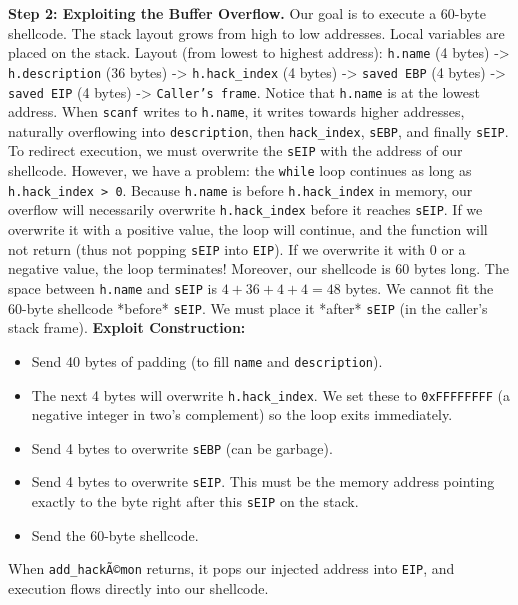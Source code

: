 \documentclass{article}
\begin{document}
\textbf{Step 2: Exploiting the Buffer Overflow.}
Our goal is to execute a 60-byte shellcode.
The stack layout grows from high to low addresses. Local variables are placed on the stack.
Layout (from lowest to highest address): \texttt{h.name} (4 bytes) -> \texttt{h.description} (36 bytes) -> \texttt{h.hack\_index} (4 bytes) -> \texttt{saved EBP} (4 bytes) -> \texttt{saved EIP} (4 bytes) -> \texttt{Caller's frame}.
Notice that \texttt{h.name} is at the lowest address. When \texttt{scanf} writes to \texttt{h.name}, it writes towards higher addresses, naturally overflowing into \texttt{description}, then \texttt{hack\_index}, \texttt{sEBP}, and finally \texttt{sEIP}.
To redirect execution, we must overwrite the \texttt{sEIP} with the address of our shellcode.
However, we have a problem: the \texttt{while} loop continues as long as \texttt{h.hack\_index > 0}. Because \texttt{h.name} is before \texttt{h.hack\_index} in memory, our overflow will necessarily overwrite \texttt{h.hack\_index} before it reaches \texttt{sEIP}. If we overwrite it with a positive value, the loop will continue, and the function will not return (thus not popping \texttt{sEIP} into \texttt{EIP}). If we overwrite it with $0$ or a negative value, the loop terminates!
Moreover, our shellcode is 60 bytes long. The space between \texttt{h.name} and \texttt{sEIP} is $4 + 36 + 4 + 4 = 48$ bytes. We cannot fit the 60-byte shellcode *before* \texttt{sEIP}. We must place it *after* \texttt{sEIP} (in the caller's stack frame).
\textbf{Exploit Construction:}
\begin{itemize}
    \item[\textbf{1.}] Send 40 bytes of padding (to fill \texttt{name} and \texttt{description}).
    \item[\textbf{2.}] The next 4 bytes will overwrite \texttt{h.hack\_index}. We set these to \texttt{0xFFFFFFFF} (a negative integer in two's complement) so the loop exits immediately.
    \item[\textbf{3.}] Send 4 bytes to overwrite \texttt{sEBP} (can be garbage).
    \item[\textbf{4.}] Send 4 bytes to overwrite \texttt{sEIP}. This must be the memory address pointing exactly to the byte right after this \texttt{sEIP} on the stack.
    \item[\textbf{5.}] Send the 60-byte shellcode.
\end{itemize}
When \texttt{add\_hackÃ©mon} returns, it pops our injected address into \texttt{EIP}, and execution flows directly into our shellcode.
\end{document}
